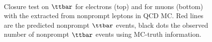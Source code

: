 \begin{figure}[h]
\noindent
{}\\
\caption{Closure test on $\ttbar$ for electrons (top) and for muons
  (bottom) with the \fr extracted from nonprompt leptons in QCD MC. Red lines are the predicted nonprompt $\ttbar$ events, black dots the observed number of nonprompt $\ttbar$ events using MC-truth information.}
\label{fig:closures2_ele}
\end{figure}


